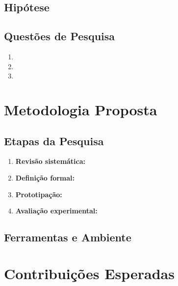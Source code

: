 \documentclass[12pt,a4paper]{article}
\begin{document}
\subsection{Hipótese}

\lipsum[24]

\subsection{Questões de Pesquisa}
\begin{enumerate}
  \item \lipsum[25][1-2]
  \item \lipsum[25][3-4]
  \item \lipsum[26][1-2]
\end{enumerate}

\section{Metodologia Proposta}

\lipsum[27-28]

\subsection{Etapas da Pesquisa}
\begin{enumerate}
  \item \textbf{Revisão sistemática:} \lipsum[29][1-2]
  \item \textbf{Definição formal:} \lipsum[29][3-4]
  \item \textbf{Prototipação:} \lipsum[30][1-2]
  \item \textbf{Avaliação experimental:} \lipsum[30][3-4]
\end{enumerate}

\subsection{Ferramentas e Ambiente}

\lipsum[31]

\section{Contribuições Esperadas}
\end{document}
